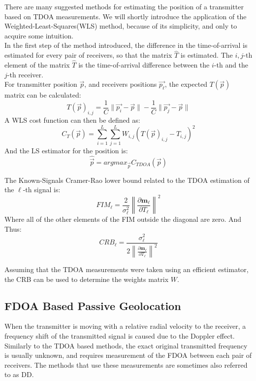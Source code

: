 \documentclass[10pt,a4paper]{report}
\begin{document}
There are many suggested methods for estimating the position of a transmitter based on TDOA measurements. We will shortly introduce the application of the Weighted-Least-Squares(WLS) method, because of its simplicity, and only to acquire some intuition.\\

In the first step of the method introduced, the difference in the time-of-arrival is estimated for every pair of receivers, so that the matrix $\hat{T}$ is estimated. The $i,j$-th element of the matrix $\hat{T}$ is the time-of-arrival difference between the $i$-th and the $j$-th receiver.\\


For transmitter position $\vec{p}$, and receivers positions $\vec{p_\ell}$, the expected $T(\vec{p})$ matrix can be calculated:
\begin{equation}
T(\vec{p})_{i,j} = \frac{1}{C}\|\vec{p_i}-\vec{p}\|-\frac{1}{C}\|\vec{p_j}-\vec{p}\|
\end{equation}
A WLS cost function can then be defined as:
\begin{equation}
C_T(\vec{p}) = \sum_{i=1}^L \sum_{j=1}^L W_{i,j}(T(\vec{p})_{i,j}-\hat{T}_{i,j})^2
\end{equation}
And the LS estimator for the position is:
\begin{equation}
\hat{\vec{p}} = argmax_{\vec{p}}C_{TDOA}(\vec{p})
\end{equation}

The Known-Signals Cramer-Rao lower bound related to the TDOA estimation of the $\ell$-th signal is:
\begin{equation}
{FIM}_\ell = \frac{2}{\sigma_\ell^2}\left\|\frac{\partial \mathbf{m_\ell}}{\partial T_\ell}\right\|^2
\end{equation}
Where all of the other elements of the FIM outside the diagonal are zero. And Thus:
\begin{equation}
{CRB}_\ell = \frac{\sigma_\ell^2}{2\left\|\frac{\partial \mathbf{m_\ell}}{\partial T_\ell}\right\|^2}
\end{equation}

Assuming that the TDOA measurements were taken using an efficient estimator, the CRB can be used to determine the weights matrix $W$.

\subsection{FDOA Based Passive Geolocation}
When the transmitter is moving with a relative radial velocity to the receiver, a frequency shift of the transmitted signal is caused due to the Doppler effect.\\
Similarly to the TDOA based methods, the exact original transmitted frequency is usually unknown, and requires measurement of the FDOA between each pair of receivers.
The methods that use these measurements are sometimes also referred to as DD.\\
\end{document}
